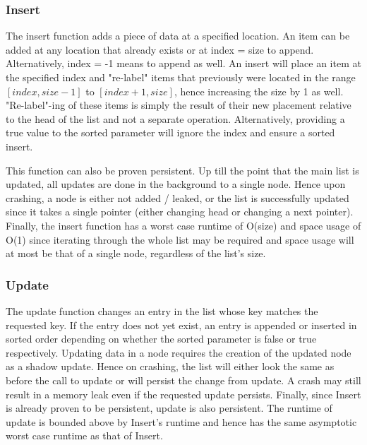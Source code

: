 \documentclass[twocolumn]{article}
\begin{document}
\subsubsection{Insert}

The insert function adds a piece of data at a specified location. An item can be
added at any location that already exists or at index = size to append.
Alternatively, index = -1 means to append as well. An insert will place an item
at the specified index and "re-label" items that previously were located in the
range $[index,size-1]$ to $[index+1,size]$, hence increasing the size by 1 as
well. "Re-label"-ing of these items is simply the result of their new placement
relative to the head of the list and not a separate operation. Alternatively,
providing a true value to the sorted parameter will ignore the index and ensure
a sorted insert.

This function can also be proven persistent. Up till the point that the main
list is updated, all updates are done in the background to a single node. Hence
upon crashing, a node is either not added / leaked, or the list is successfully
updated since it takes a single pointer (either changing head or changing a next
pointer). Finally, the insert function has a worst case runtime of O(size) and
space usage of O(1) since iterating through the whole list may be required and
space usage will at most be that of a single node, regardless of the list's
size.

\subsubsection{Update}


The update function changes an entry in the list whose key matches the requested
key. If the entry does not yet exist, an entry is appended or inserted in sorted
order depending on whether the sorted parameter is false or true respectively.
Updating data in a node requires the creation of the updated node as a shadow
update. Hence on crashing, the list will either look the same as before the call
to update or will persist the change from update. A crash may still result in a
memory leak even if the requested update persists. Finally, since Insert is
already proven to be persistent, update is also persistent. The runtime of
update is bounded above by Insert's runtime and hence has the same asymptotic
worst case runtime as that of Insert.
\end{document}
